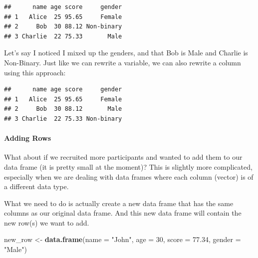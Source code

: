\documentclass[
]{book}
\newenvironment{Shaded}{\begin{snugshade}}{\end{snugshade}}
\newcommand{\AttributeTok}[1]{\textcolor[rgb]{0.13,0.29,0.53}{#1}}
\newcommand{\CommentTok}[1]{\textcolor[rgb]{0.56,0.35,0.01}{\textit{#1}}}
\newcommand{\DecValTok}[1]{\textcolor[rgb]{0.00,0.00,0.81}{#1}}
\newcommand{\FloatTok}[1]{\textcolor[rgb]{0.00,0.00,0.81}{#1}}
\newcommand{\FunctionTok}[1]{\textcolor[rgb]{0.13,0.29,0.53}{\textbf{#1}}}
\newcommand{\NormalTok}[1]{#1}
\newcommand{\OtherTok}[1]{\textcolor[rgb]{0.56,0.35,0.01}{#1}}
\newcommand{\SpecialCharTok}[1]{\textcolor[rgb]{0.81,0.36,0.00}{\textbf{#1}}}
\newcommand{\StringTok}[1]{\textcolor[rgb]{0.31,0.60,0.02}{#1}}
\begin{document}
\begin{verbatim}
##      name age score     gender
## 1   Alice  25 95.65     Female
## 2     Bob  30 88.12 Non-binary
## 3 Charlie  22 75.33       Male
\end{verbatim}

Let's say I noticed I mixed up the genders, and that Bob is Male and Charlie is Non-Binary. Just like we can rewrite a variable, we can also rewrite a column using this approach:

\begin{Shaded}
\end{Shaded}

\begin{verbatim}
##      name age score     gender
## 1   Alice  25 95.65     Female
## 2     Bob  30 88.12       Male
## 3 Charlie  22 75.33 Non-binary
\end{verbatim}

\paragraph{Adding Rows}\label{adding-rows}

What about if we recruited more participants and wanted to add them to our data frame (it is pretty small at the moment)? This is slightly more complicated, especially when we are dealing with data frames where each column (vector) is of a different data type.

What we need to do is actually create a new data frame that has the same columns as our original data frame. And this new data frame will contain the new row(s) we want to add.

\begin{Shaded}
\begin{Highlighting}[]
\NormalTok{new\_row }\OtherTok{\textless{}{-}} \FunctionTok{data.frame}\NormalTok{(}\AttributeTok{name =} \StringTok{"John"}\NormalTok{, }\AttributeTok{age =} \DecValTok{30}\NormalTok{, }\AttributeTok{score =} \FloatTok{77.34}\NormalTok{, }\AttributeTok{gender =} \StringTok{"Male"}\NormalTok{)}
\end{Highlighting}
\end{Shaded}
\end{document}
